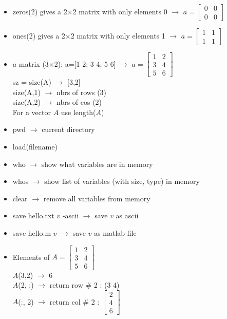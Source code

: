 \documentclass[a4paper,12pt]{report}
\begin{document}
\begin{appendices}
\begin{itemize}
\item zeros(2) gives a 2$\times$2 matrix with only elements 0 $\rightarrow$ $a = \left[ \begin{smallmatrix} 0 & 0 \\ 0 & 0  \end{smallmatrix} \right]$

\item ones(2) gives a 2$\times$2 matrix with only elements 1 $\rightarrow$ $a = \left[ \begin{smallmatrix} 1 & 1 \\ 1 & 1  \end{smallmatrix} \right]$

\item $a$ matrix (3$\times$2): a=[1 2; 3 4; 5 6] $\rightarrow$ $a = \left[ \begin{smallmatrix} 1 & 2\\ 3 & 4 \\ 5 & 6 \end{smallmatrix} \right]$ \\
sz = size(A) $\rightarrow$ [3,2] \\
size(A,1) $\rightarrow$ nbrs of rows (3) \\
size(A,2) $\rightarrow$ nbrs of cos (2) \\
For a vector $A$ use length($A$)

\item pwd $\rightarrow$ current directory
\item load(filename)
\item who $\rightarrow$ show what variables are in memory
\item whos $\rightarrow$ show list of variables (with size, type) in memory
\item clear $\rightarrow$ remove all variables from memory
\item save hello.txt $v$ -ascii $\rightarrow$ save $v$ as ascii
\item save hello.m $v$  $\rightarrow$ save $v$ as matlab file

\item  Elements of $A = \left[ \begin{smallmatrix} 1 & 2\\ 3 & 4 \\ 5 & 6 \end{smallmatrix} \right]$ \\
$A$(3,2) $\rightarrow$ 6 \\
$A$(2, :) $\rightarrow$ return row \# 2 : (3 4) \\
$A$(:, 2) $\rightarrow$ return col \# 2 : $\left[ \begin{smallmatrix} 2\\ 4 \\ 6 \end{smallmatrix} \right]$ \\


\end{itemize}
\end{appendices}
\end{document}
